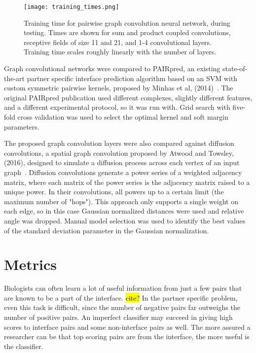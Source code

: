 \begin{figure}
	\texttt{[image: training\_times.png]}
	\caption{Training time for pairwise graph convolution neural network, during testing. Times are shown for sum and product coupled convolutions, receptive fields of size 11 and 21, and 1-4 convolutional layers. Training time scales roughly linearly with the number of layers.
	\label{fig:train_times}}
\end{figure}

Graph convolutional networks were compared to PAIRpred, an existing state-of-the-art partner specific interface prediction algorithm based on an SVM with custom symmetric pairwise kernels, proposed by Minhas et al, (2014)~\cite{minhas2014}.
The original PAIRpred publication used different complexes, slightly different features, and a different experimental protocol, so it was run with.
Grid search with five-fold cross validation was used to select the optimal kernel and soft margin parameters.

The proposed graph convolution layers were also compared against diffusion convolutions, a spatial graph convolution proposed by Atwood and Towsley, (2016), designed to simulate a diffusion process across each vertex of an input graph~\cite{atwood2016}.
Diffusion convolutions generate a power series of a weighted adjacency matrix, where each matrix of the power series is the adjacency matrix raised to a unique power.
In their convolutions, all powers up to a certain limit (the maximum number of "hops").
This approach only supports a single weight on each edge, so in this case Gaussian normalized distances were used and relative angle was dropped. 
Manual model selection was used to identify the best values of the standard deviation parameter in the Gaussian normalization.

\section{Metrics}

Biologists can often learn a lot of useful information from just a few pairs that are known to be a part of the interface. \hl{cite?}
In the partner specific problem, even this task is difficult, since the number of negative pairs far outweighs the number of positive pairs.
An imperfect classifier may succeed in giving high scores to interface pairs and some non-interface pairs as well.
The more assured a researcher can be that top scoring pairs are from the interface, the more useful is the classifier.

